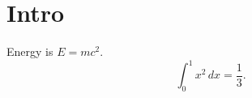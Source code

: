 \documentclass{article}
\begin{document}
\section{Intro}
Energy is $E=mc^2$.
\begin{equation}
  \int_0^1 x^2 \, dx = \frac{1}{3}.
\end{equation}
\end{document}
